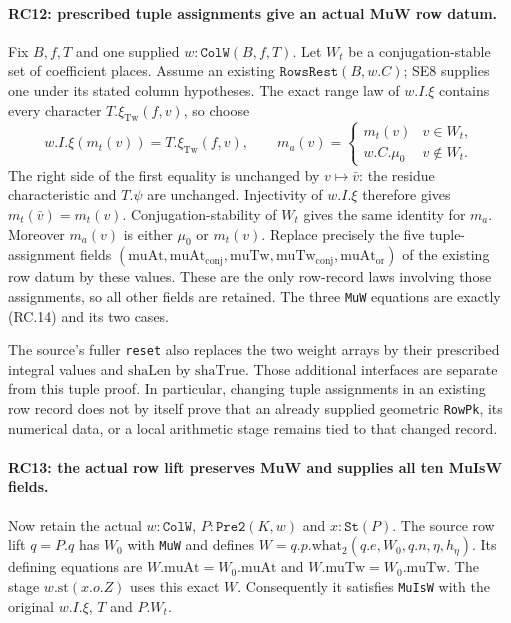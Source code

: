 \paragraph{RC12: prescribed tuple assignments give an actual MuW row datum.}
Fix $B,f,T$ and one supplied $w:\texttt{ColW}(B,f,T)$.
Let $W_t$ be a conjugation-stable set of coefficient places.
Assume an existing $\texttt{RowsRest}(B,w.C)$; SE8 supplies one under
its stated column hypotheses. The exact range law of $w.I.\xi$ contains
every character $T.\xi_{\mathrm{Tw}}(f,v)$, so choose
\[
 w.I.\xi(m_t(v))=T.\xi_{\mathrm{Tw}}(f,v),\qquad
 m_a(v)=
 \begin{cases}m_t(v)&v\in W_t,\\w.C.\mu_0&v\notin W_t.\end{cases}
                                                               \tag{RC.14}
\]
The right side of the first equality is unchanged by $v\mapsto\bar v$:
the residue characteristic and $T.\psi$ are unchanged. Injectivity
of $w.I.\xi$ therefore gives $m_t(\bar v)=m_t(v)$.
Conjugation-stability of $W_t$ gives the same identity for $m_a$.
Moreover $m_a(v)$ is either $\mu_0$ or $m_t(v)$.
Replace precisely the five tuple-assignment fields
$(\mathrm{muAt},\mathrm{muAt}_{\mathrm{conj}},\mathrm{muTw},\mathrm{muTw}_{\mathrm{conj}},\mathrm{muAt}_{\mathrm{or}})$
of the existing row datum by these values. These are the only row-record
laws involving those assignments, so all other fields are retained.
The three \texttt{MuW} equations are exactly (RC.14) and its two cases.

The source's fuller \texttt{reset} also replaces the two weight arrays
by their prescribed integral values and $\mathrm{shaLen}$ by
$\mathrm{shaTrue}$. Those additional interfaces are separate from this
tuple proof. In particular, changing tuple assignments in an existing
row record does not by itself prove that an already supplied geometric
\texttt{RowPk}, its numerical data, or a local arithmetic stage remains
tied to that changed record.

\paragraph{RC13: the actual row lift preserves MuW and supplies all ten MuIsW fields.}
Now retain the actual $w:\texttt{ColW}$,
$P:\texttt{Pre2}(K,w)$ and $x:\texttt{St}(P)$.
The source row lift $q=P.q$ has $W_0$ with \texttt{MuW} and defines
$W=q.p.\mathrm{what}_2(q.e,W_0,q.n,\eta,h_\eta)$.
Its defining equations are
$W.\mathrm{muAt}=W_0.\mathrm{muAt}$ and $W.\mathrm{muTw}=W_0.\mathrm{muTw}$.
The stage $w.\mathrm{st}(x.o.Z)$ uses this exact $W$.
Consequently it satisfies \texttt{MuIsW} with the original $w.I.\xi$,
$T$ and $P.W_t$.

